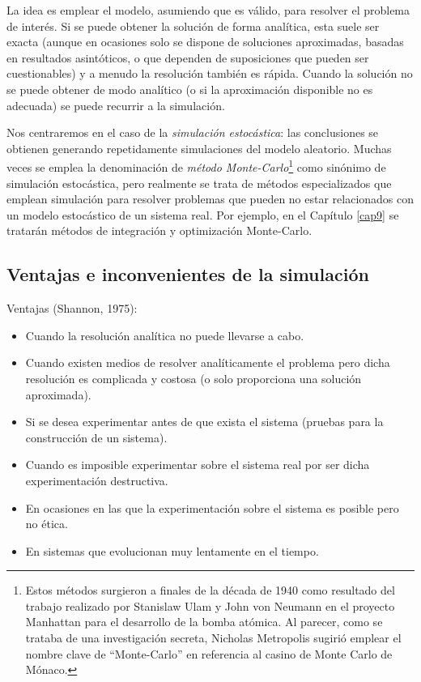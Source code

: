 \documentclass[
]{book}
\theoremstyle{break}
\theoremstyle{definition}
\theoremstyle{definition}
\theoremstyle{definition}
\theoremstyle{definition}
\theoremstyle{remark}
\begin{document}
La idea es emplear el modelo, asumiendo que es válido, para resolver el problema de interés.
Si se puede obtener la solución de forma analítica, esta suele ser exacta (aunque en ocasiones solo se dispone de soluciones aproximadas, basadas en resultados asintóticos, o que dependen de suposiciones que pueden ser cuestionables) y a menudo la resolución también es rápida.
Cuando la solución no se puede obtener de modo analítico (o si la aproximación disponible no es adecuada) se puede recurrir a la simulación.

Nos centraremos en el caso de la \emph{simulación estocástica}: las conclusiones se obtienen generando repetidamente simulaciones del modelo aleatorio.
Muchas veces se emplea la denominación de \emph{método Monte-Carlo}\footnote{Estos métodos surgieron a finales de la década de 1940 como resultado del trabajo realizado por Stanislaw Ulam y John von Neumann en el proyecto Manhattan para el desarrollo de la bomba atómica. Al parecer, como se trataba de una investigación secreta, Nicholas Metropolis sugirió emplear el nombre clave de ``Monte-Carlo'' en referencia al casino de Monte Carlo de Mónaco.} como sinónimo de simulación estocástica, pero realmente se trata de métodos especializados que emplean simulación para resolver problemas que pueden no estar relacionados con un modelo estocástico de un sistema real. Por ejemplo, en el Capítulo \ref{cap9} se tratarán métodos de integración y optimización Monte-Carlo.

\hypertarget{ventajas-e-inconvenientes-de-la-simulaciuxf3n}{%
\subsection{Ventajas e inconvenientes de la simulación}\label{ventajas-e-inconvenientes-de-la-simulaciuxf3n}}

Ventajas (Shannon, 1975):

\begin{itemize}
\item
  Cuando la resolución analítica no puede llevarse a cabo.
\item
  Cuando existen medios de resolver analíticamente el problema
  pero dicha resolución es complicada y costosa
  (o solo proporciona una solución aproximada).
\item
  Si se desea experimentar antes de que exista el sistema
  (pruebas para la construcción de un sistema).
\item
  Cuando es imposible experimentar sobre el sistema real
  por ser dicha experimentación destructiva.
\item
  En ocasiones en las que la experimentación sobre el sistema es
  posible pero no ética.
\item
  En sistemas que evolucionan muy lentamente en el tiempo.
\end{itemize}
\end{document}
